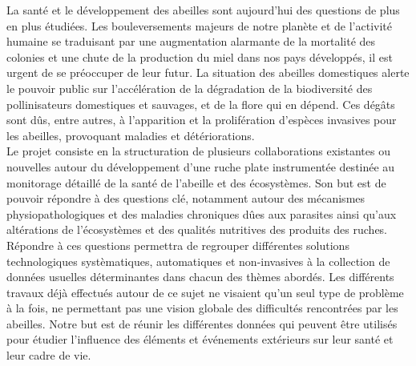 \documentclass[11pt,french,a4paper]{report}
\begin{document}
La santé et le développement des abeilles sont aujourd’hui des questions de plus en plus étudiées. Les bouleversements
majeurs de notre planète et de l’activité humaine se traduisant par une augmentation alarmante de la mortalité
des colonies et une chute de la production du miel dans nos pays développés, il est urgent de se préoccuper de leur futur. 
La situation des abeilles domestiques alerte le pouvoir public sur l’accélération de la dégradation de la biodiversité des 
pollinisateurs domestiques et sauvages, et de la flore qui en dépend. Ces dégâts sont dûs, entre autres, à l’apparition 
et la prolifération d’espèces invasives pour les abeilles, provoquant maladies et détériorations. \\ 
Le projet consiste en la structuration de plusieurs collaborations existantes ou nouvelles autour du développement 
d’une ruche plate instrumentée destinée au monitorage détaillé de la santé de l’abeille et des écosystèmes. Son but est de
pouvoir répondre à des questions clé, notamment autour des mécanismes physiopathologiques et des maladies chroniques 
dûes aux parasites ainsi qu’aux altérations de l’écosystèmes et des qualités nutritives des produits des ruches. \\
Répondre à ces questions permettra de regrouper différentes solutions technologiques systèmatiques, 
automatiques et non-invasives à la collection de données usuelles déterminantes dans chacun des thèmes abordés.
Les différents travaux déjà effectués autour de ce sujet ne visaient qu’un seul type de problème à la fois, 
ne permettant pas une vision globale des difficultés rencontrées par les abeilles. Notre but est de réunir les différentes
données qui peuvent être utilisés pour étudier l’influence des éléments et événements extérieurs sur leur santé et leur cadre de vie.\\
\end{document}
